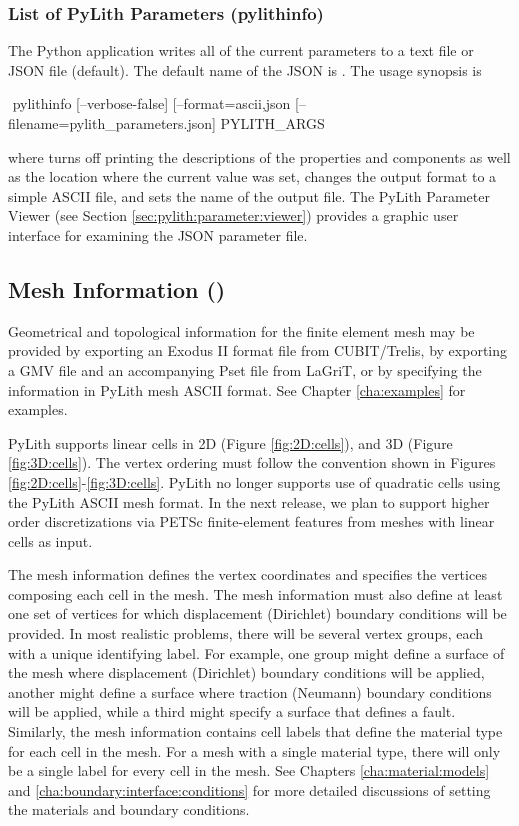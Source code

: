 \subsubsection{List of PyLith Parameters ({\ttfamily pylithinfo})}
\label{sec:pylithinfo}

The Python application  writes all of the current
parameters to a text file or JSON file (default). The default name of the JSON is .
The usage synopsis is
\begin{shell}
$$ pylithinfo [--verbose-false] [--format={ascii,json} [--filename=pylith_parameters.json] PYLITH_ARGS
\end{shell}
where  turns off printing the descriptions of
the properties and components as well as the location where the
current value was set,  changes the
output format to a simple ASCII file, and
 sets the name of the
output file. The PyLith Parameter Viewer (see Section
\ref{sec:pylith:parameter:viewer}) provides a graphic user interface
for examining the JSON parameter file. 


\subsection{Mesh Information ()}

Geometrical and topological information for the finite element mesh
may be provided by exporting an Exodus II format file from
CUBIT/Trelis, by exporting a GMV file and an accompanying Pset file
from LaGriT, or by specifying the information in PyLith mesh ASCII
format. See Chapter \vref{cha:examples} for examples.

PyLith supports linear cells in 2D (Figure \vref{fig:2D:cells}), and
3D (Figure \vref{fig:3D:cells}).  The vertex ordering must follow the
convention shown in Figures \vref{fig:2D:cells}-\vref{fig:3D:cells}.
PyLith no longer supports use of quadratic cells using the PyLith
ASCII mesh format. In the next release, we plan to support higher
order discretizations via PETSc finite-element features from meshes
with linear cells as input.

The mesh information defines the vertex coordinates and specifies
the vertices composing each cell in the mesh. The mesh information
must also define at least one set of vertices for which displacement
(Dirichlet) boundary conditions will be provided. In most realistic
problems, there will be several vertex groups, each with a unique
identifying label. For example, one group might define a surface of
the mesh where displacement (Dirichlet) boundary conditions will be
applied, another might define a surface where traction (Neumann) boundary
conditions will be applied, while a third might specify a surface
that defines a fault. Similarly, the mesh information contains cell
labels that define the material type for each cell in the mesh. For
a mesh with a single material type, there will only be a single label
for every cell in the mesh. See Chapters \vref{cha:material:models}
and \vref{cha:boundary:interface:conditions} for more detailed discussions
of setting the materials and boundary conditions.

